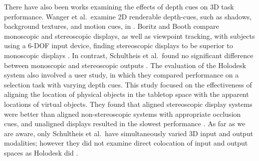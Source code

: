 There have also been works examining the effects of depth cues on 3D task
performance. Wanger et al.\ examine 2D renderable depth-cues, such as shadows,
background textures, and motion cues, in \cite{wanger1992perceiving}. Boritz and
Booth compare monoscopic and stereoscopic displays, as well as viewpoint
tracking, with subjects using a 6-DOF input device, finding stereoscopic
displays to be superior to monoscopic displays \cite{boritz1997study}. In
contrast, Schultheis et al.\ found no significant
difference between monoscopic and stereoscopic outputs
\cite{schultheis2012comparison}. The evaluation of the Holodesk
system also involved
a user study, in which they compared performance on a selection task with varying
depth cues. This study
focused on the effectiveness of aligning the location of physical objects in the tabletop
space with the apparent locations of virtual objects. They found that aligned
stereoscopic display systems were better than aligned non-stereoscopic systems
with appropriate occlusion cues, and unaligned displays resulted in the slowest
performance \cite{holodesk}. As far as we are aware, only Schultheis et al.\ have
simultaneously varied 3D input and output modalities; however they did not
examine direct colocation of input and output spaces as Holodesk did
\cite{schultheis2012comparison}.


